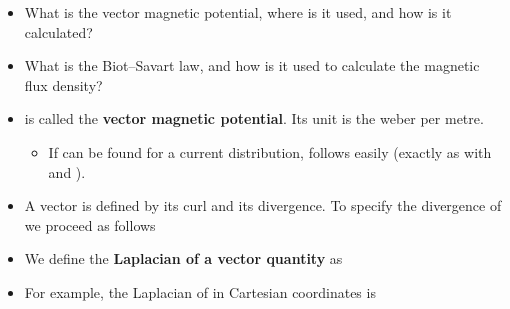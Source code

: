 \begin{ELunit}


\begin{itemize}
\tightlist
\item
  What is the vector magnetic potential, where is it used, and how is it calculated?
\item
  What is the Biot--Savart law, and how is it used to calculate the magnetic flux density?
\end{itemize}


\begin{itemize}
\tightlist
\item
   is called the \textbf{vector magnetic potential}. Its unit is the weber per metre.

  \begin{itemize}
  \tightlist
  \item
    If  can be found for a current distribution,  follows easily (exactly as with  and ).
  \end{itemize}
\item
  A vector is defined by its curl and its divergence. To specify the divergence of  we proceed as follows
\end{itemize}


\begin{itemize}
\tightlist
\item
  We define the \textbf{Laplacian of a vector quantity} as
\end{itemize}


\begin{itemize}
\tightlist
\item
  For example, the Laplacian of  in Cartesian coordinates is
\end{itemize}



\end{ELunit}
